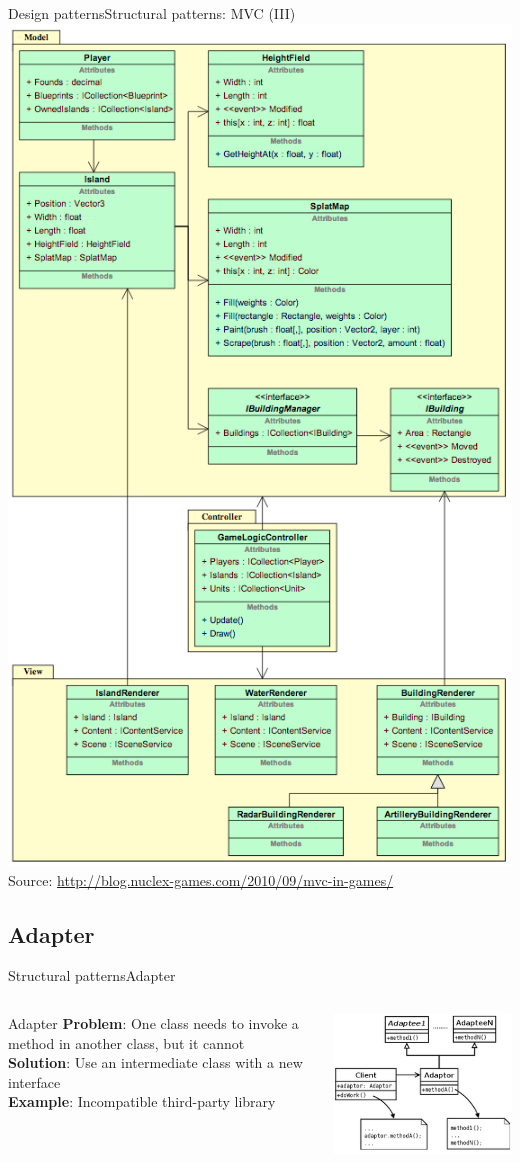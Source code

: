 \documentclass[10pt,compress]{beamer} %
\begin{document}
\begin{frame}[plain]{Design patterns}{Structural patterns: MVC (III)}
	\centering\includegraphics[width=0.4\linewidth]{figs/mvcgames}\\
	\centering \scriptsize{Source: \url{http://blog.nuclex-games.com/2010/09/mvc-in-games/}}
\end{frame}

\subsection[Adapter]{Adapter}
\begin{frame}{Structural patterns}{Adapter}
    \begin{columns}
	   \begin{block}{Adapter}
			\textbf{Problem}: One class needs to invoke a method in another class, but it cannot\\
			\textbf{Solution}: Use an intermediate class with a new interface\\
			\textbf{Example}: Incompatible third-party library\\
		\end{block}
			\centering\includegraphics[width=\linewidth]{figs/adapter}\\
	\end{columns}
\end{frame}
\end{document}
